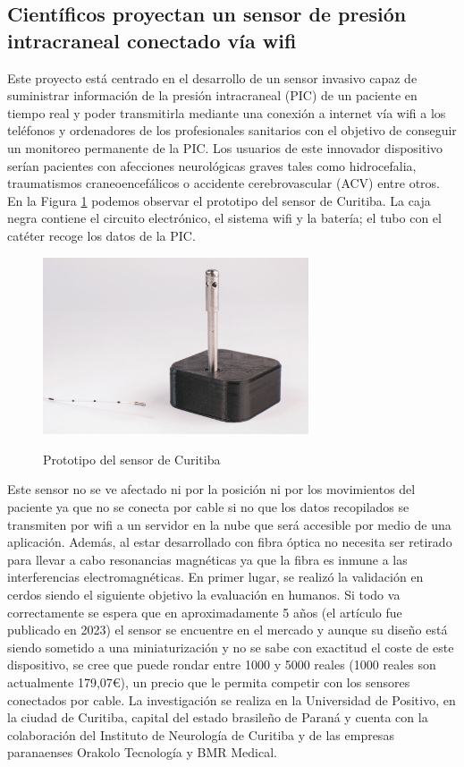 \subsection{Científicos proyectan un sensor de presión intracraneal conectado vía wifi \cite{curitibaa}}
Este proyecto está centrado en el desarrollo de un sensor invasivo capaz de suministrar información de la presión intracraneal (PIC) de un paciente en tiempo real y poder transmitirla mediante una conexión a internet vía wifi a los teléfonos y ordenadores de los profesionales sanitarios con el objetivo de conseguir un monitoreo permanente de la PIC. Los usuarios de este innovador dispositivo serían pacientes con afecciones neurológicas graves tales como hidrocefalia, traumatismos craneoencefálicos o accidente cerebrovascular (ACV) entre otros. En la Figura \ref{fig:sensor_curitiba} podemos observar el prototipo del sensor de Curitiba. La caja negra contiene el circuito electrónico, el sistema wifi y la batería; el tubo con el catéter recoge los datos de la PIC.
\begin{figure}[h]
    \centering
    \includegraphics[width=0.7\textwidth]{img/curitiba.jpg}
    \caption{Prototipo del sensor de Curitiba}
    \cite{curitibaa}
    \label{fig:sensor_curitiba}
\end{figure}
Este sensor no se ve afectado ni por la posición ni por los movimientos del paciente ya que no se conecta por cable si no que los datos recopilados se transmiten por wifi a un servidor en la nube que será accesible por medio de una aplicación. Además, al estar desarrollado con fibra óptica no necesita ser retirado para llevar a cabo resonancias magnéticas ya que la fibra es inmune a las interferencias electromagnéticas.
En primer lugar, se realizó la validación en cerdos siendo el siguiente objetivo la evaluación en humanos. Si todo va correctamente se espera que en aproximadamente 5 años (el artículo fue publicado en 2023) el sensor se encuentre en el mercado y aunque su diseño está siendo sometido a una miniaturización y no se sabe con exactitud el coste de este dispositivo, se cree que puede rondar entre 1000 y 5000 reales (1000 reales son actualmente 179,07€), un precio que le permita competir con los sensores conectados por cable.
La investigación se realiza en la Universidad de Positivo, en la ciudad de Curitiba, capital del estado brasileño de Paraná y cuenta con la colaboración del Instituto de Neurología de Curitiba y de las empresas paranaenses Orakolo Tecnología y BMR Medical.

